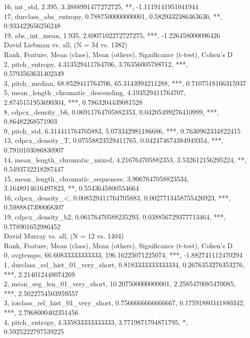 16, int_std, 2.395, 3.3888991477272725, **, -1.1119141951041944\\
17, durclass_abs_entropy, 0.7887500000000001, 0.5829332386363636, **, 0.933422656256248\\
19, abs_int_mean, 1.935, 2.6907102272727275, ***, -1.226458000096426\\
David Liebman vs. all, (N = 34 vs. 1382)\\
Rank, Feature, Mean (class), Mean (others), Significance (t-test), Cohen's D\\
2, pitch_entropy, 4.313529411764706, 3.76356005788712, ***, 0.5793563631402349\\
3, pitch_median, 68.8529411764706, 65.3143994211288, ***, 0.7107518166315937\\
5, mean_length_chromatic_descending, 4.193529411764707, 2.8745151953690304, ***, 0.7863204439081528\\
8, cdpcx_density_b6, 0.06911764705882353, 0.04205499276410999, ***, 0.86482268571903\\
9, pitch_std, 6.314411764705883, 5.073342981186686, ***, 0.7630962334822415\\
13, cdpcx_density_T, 0.07558823529411765, 0.042474674384949354, ***, 0.7910103086830907\\
14, mean_length_chromatic_mixed, 4.216764705882353, 3.532612156295224, **, 0.5493732218287447\\
15, mean_length_chromatic_sequences, 3.9067647058823534, 3.1648914616497823, **, 0.5543645800554664\\
16, cdpcx_density_<, 0.008529411764705883, 0.0027713458755426923, ***, 0.5988847390068307\\
19, cdpcx_density_b2, 0.06176470588235293, 0.038856729377713464, ***, 0.778901652986452\\
David Murray vs. all, (N = 12 vs. 1404)\\
Rank, Feature, Mean (class), Mean (others), Significance (t-test), Cohen's D\\
0, avgtempo, 66.60833333333333, 196.16225071225074, ***, -1.882741112470294\\
1, durclass_rel_hist_01_very_short, 0.8183333333333334, 0.2676353276353276, ***, 2.214012448074269\\
2, mean_seg_len_01_very_short, 10.207500000000001, 2.2585470085470085, ***, 2.5022754503959557\\
3, ioiclass_rel_hist_01_very_short, 0.7566666666666667, 0.17591880341880342, ***, 2.7968000402351456\\
4, pitch_entropy, 4.335833333333333, 3.7719871794871795, *, 0.5925222797539225\\
